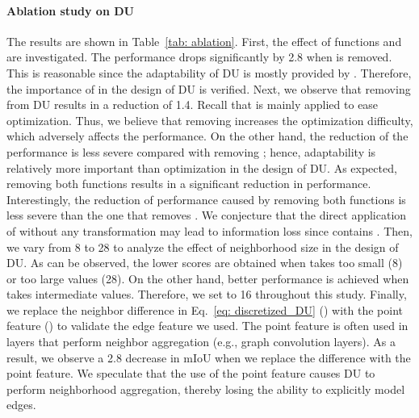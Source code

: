 \documentclass[a4paper,fleqn]{cas-dc}
\begin{document}
\paragraph{Ablation study on DU} The results are shown in Table~\ref{tab: ablation}. First, the effect of functions  and  are investigated. 
The performance drops significantly by 2.8 when  is removed. This is reasonable since the adaptability of DU is mostly provided by . Therefore, the importance of  in the design of DU is verified. 
Next, we observe that removing  from DU results in a reduction of 1.4. Recall that  is mainly applied to ease optimization. Thus, we believe that removing  increases the optimization difficulty, which adversely affects the performance. On the other hand, the reduction of the performance is less severe compared with removing ; hence, adaptability is relatively more important than optimization in the design of DU. 
As expected, removing both functions results in a significant reduction in performance. Interestingly, the reduction of performance caused by removing both functions is less severe than the one that removes . We conjecture that the direct application of  without any transformation may lead to information loss since  contains .        
Then, we vary  from 8 to 28 to analyze the effect of neighborhood size in the design of DU. As can be observed, the lower scores are obtained when  takes too small (8) or too large values (28). On the other hand, better performance is achieved when  takes intermediate values. Therefore, we set  to 16 throughout this study.   
Finally, we replace the neighbor difference in Eq.~\eqref{eq: discretized_DU} () with the point feature () to validate the edge feature we used. The point feature is often used in layers that perform neighbor aggregation (e.g., graph convolution layers). As a result, we observe a 2.8 decrease in mIoU when we replace the difference with the point feature. We speculate that the use of the point feature causes DU to perform neighborhood aggregation, thereby losing the ability to explicitly model edges.
\end{document}
